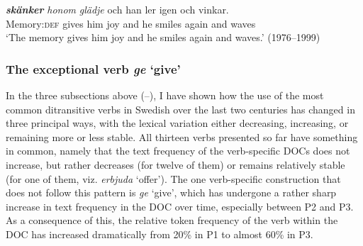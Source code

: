 \documentclass[output=paper]{langscibook}
\begin{document}
\ex {} \textbf{\textit{skänker}} \textit{honom} \textit{glädje} {och} {han} {ler} {igen} {och} {vinkar.} \\
        Memory:\textsc{def} gives     him   joy     and he     smiles   again   and   waves\\
\glt ‘The memory gives him joy and he smiles again and waves.’ (1976–1999)
\z
\z


\subsubsection{The exceptional verb \textit{ge} ‘give’}\label{sec:valdeson:5.3.4}

\begin{sloppypar}
In the three subsections above (–), I have shown how the use of the most common ditransitive verbs in Swedish over the last two centuries has changed in three principal ways, with the lexical variation either decreasing, increasing, or remaining more or less stable. All thirteen verbs presented so far have something in common, namely that the text frequency of the verb-specific DOCs does not increase, but rather decreases (for twelve of them) or remains relatively stable (for one of them, viz. \textit{erbjuda} ‘offer’). The one verb-specific construction that does not follow this pattern is \textit{ge} ‘give’, which has undergone a rather sharp increase in text frequency in the DOC over time, especially between P2 and P3. As a consequence of this, the relative token frequency of the verb within the DOC has increased dramatically from 20\% in P1 to almost 60\% in P3.
\end{sloppypar}

\begin{table}
\caption{\label{tab:valdeson:21}; Frequency measures of the verb-specific DOC with \textit{ge} ‘give’}
\end{table}
\end{document}
